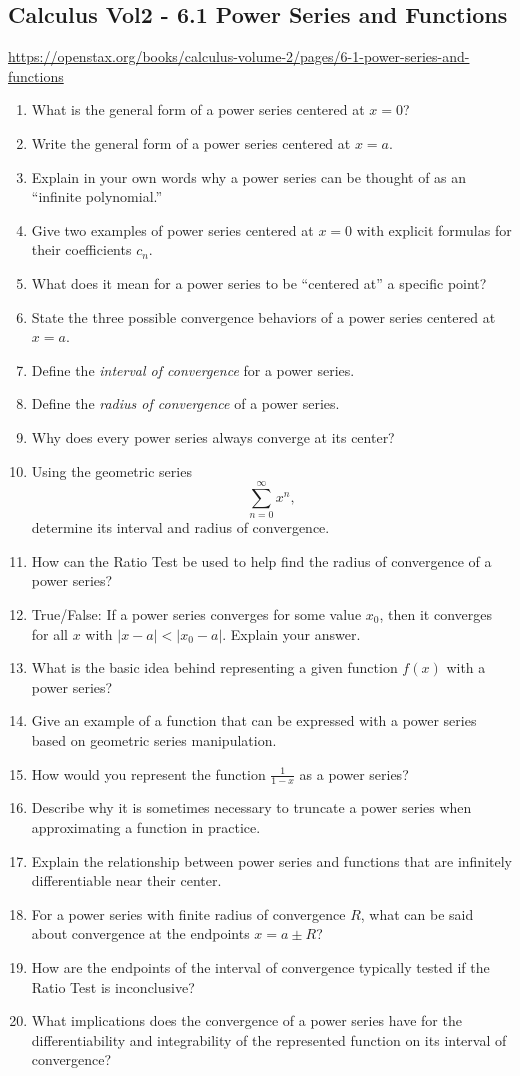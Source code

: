 \subsection{Calculus Vol2 - 6.1 Power Series and Functions}

\url{https://openstax.org/books/calculus-volume-2/pages/6-1-power-series-and-functions}

\begin{enumerate}
  \item What is the general form of a power series centered at \(x=0\)?
  \item Write the general form of a power series centered at \(x=a\).
  \item Explain in your own words why a power series can be thought of as an “infinite polynomial.”
  \item Give two examples of power series centered at \(x=0\) with explicit formulas for their coefficients \(c_n\).
  \item What does it mean for a power series to be “centered at” a specific point?
  \item State the three possible convergence behaviors of a power series centered at \(x=a\).
  \item Define the \emph{interval of convergence} for a power series.
  \item Define the \emph{radius of convergence} of a power series.
  \item Why does every power series always converge at its center?
  \item Using the geometric series
    \[
      \sum_{n=0}^\infty x^n,
    \]
    determine its interval and radius of convergence.
  \item How can the Ratio Test be used to help find the radius of convergence of a power series?
  \item True/False: If a power series converges for some value \(x_0\), then it converges for all \(x\) with \(|x-a|<|x_0-a|\). Explain your answer.
  \item What is the basic idea behind representing a given function \(f(x)\) with a power series?
  \item Give an example of a function that can be expressed with a power series based on geometric series manipulation.
  \item How would you represent the function \(\frac{1}{1-x}\) as a power series?
  \item Describe why it is sometimes necessary to truncate a power series when approximating a function in practice.
  \item Explain the relationship between power series and functions that are infinitely differentiable near their center.
  \item For a power series with finite radius of convergence \(R\), what can be said about convergence at the endpoints \(x=a\pm R\)?
  \item How are the endpoints of the interval of convergence typically tested if the Ratio Test is inconclusive?
  \item What implications does the convergence of a power series have for the differentiability and integrability of the represented function on its interval of convergence?
\end{enumerate}
